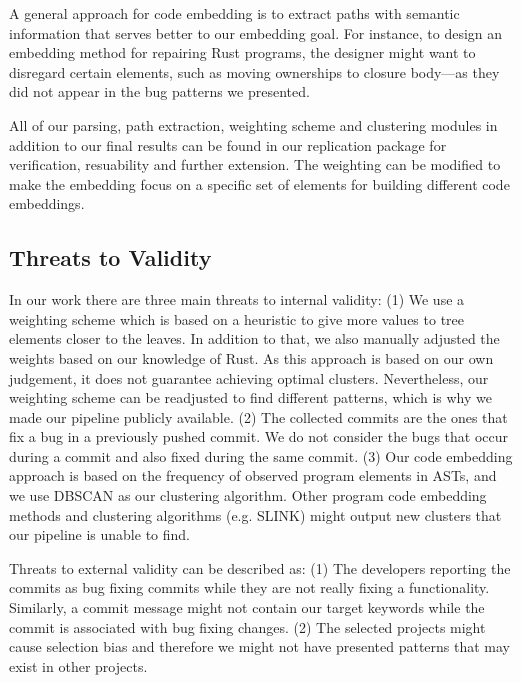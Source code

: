 A general approach for code embedding is to extract paths with semantic information that serves better to our embedding goal. For instance, to design an embedding method for repairing Rust programs, the designer might want to disregard certain elements, such as moving ownerships to closure body---as they did not appear in the bug patterns we presented.

All of our parsing, path extraction, weighting scheme and clustering modules in addition to our final results can be found in our replication package for verification, resuability and further extension. The weighting can be modified to make the embedding focus on a specific set of elements for building different code embeddings.

\subsection{Threats to Validity}

In our work there are three main threats to internal validity: (1) We use a weighting scheme which is based on a heuristic to give more values to tree elements closer to the leaves. In addition to that, we also manually adjusted the weights based on our knowledge of Rust. As this approach is based on our own judgement, it does not guarantee achieving optimal clusters. Nevertheless, our weighting scheme can be readjusted to find different patterns, which is why we made our pipeline publicly available. (2) The collected commits are the ones that fix a bug in a previously pushed commit. We do not consider the bugs that occur during a commit and also fixed during the same commit. (3) Our code embedding approach is based on the frequency of observed program elements in ASTs, and we use DBSCAN as our clustering algorithm. Other program code embedding methods and clustering algorithms (e.g. SLINK) might output new clusters that our pipeline is unable to find. 

Threats to external validity can be described as: (1) The developers reporting the commits as bug fixing commits while they are not really fixing a functionality. Similarly, a commit message might not contain our target keywords while the commit is associated with bug fixing changes. (2) The selected projects might cause selection bias and therefore we might not have presented patterns that may exist in other projects. 
